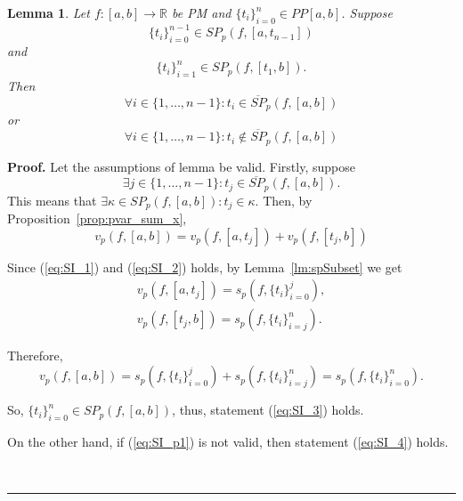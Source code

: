 \documentclass[12pt, a4paper]{article}
\newtheorem{lemma}[theorem]{Lemma}
\newenvironment{proof}[1][Proof]{\noindent \textbf{#1.} }{\  \rule{0.5em}{0.5em}}
\numberwithin{equation}{section}
\begin{document}
\begin{lemma}\label{lm:SI}
  Let $f:[a,b] \rightarrow \mathbb{R}$ be PM
  and $\{t_i\}_{i=0}^n \in PP[a, b]$.
  Suppose 
  \begin{equation}\label{eq:SI_1}
    \{t_i\}_{i=0}^{n-1} \in SP_p(f, [a, t_{n-1}]) 
  \end{equation} 
  and 
  \begin{equation}\label{eq:SI_2}
    \{t_i\}_{i=1}^{n} \in SP_p(f, [t_1, b]).
  \end{equation} 
  Then
  \begin{equation}\label{eq:SI_3}
    \forall i \in \{1,\dots,n-1\}: t_i \in \overline{SP}_p(f, [a, b])
  \end{equation} 
  or
  \begin{equation}\label{eq:SI_4}
    \forall i \in \{1,\dots,n-1\}: t_i \notin \overline{SP}_p(f, [a, b])
  \end{equation}   
\end{lemma}
\begin{proof}
  Let the assumptions of lemma be valid. 
  Firstly, suppose 
  \begin{equation}\label{eq:SI_p1}
    \exists j \in \{1,\dots,n-1\}: t_j \in \overline{SP}_p(f, [a, b]).
  \end{equation}
  This means that 
  $\exists \kappa \in SP_p(f, [a, b]): t_j \in \kappa$.
  Then, by Proposition~\ref{prop:pvar_sum_x},
  \begin{equation}
    v_p(f, [a, b]) = v_p(f, [a, t_j]) + v_p(f, [t_j, b])
  \end{equation}
  
  Since (\ref{eq:SI_1}) and (\ref{eq:SI_2}) holds, 
  by Lemma~\ref{lm:spSubset} we get 
  \begin{eqnarray}
    v_p(f, [a, t_j]) = s_p(f, \{t_i\}_{i=0}^j), \\
    v_p(f, [t_j, b]) = s_p(f, \{t_i\}_{i=j}^n).
  \end{eqnarray}
  
  Therefore,
  \begin{equation}
    v_p(f, [a, b]) = s_p(f, \{t_i\}_{i=0}^j) +  s_p(f, \{t_i\}_{i=j}^n)
      = s_p(f, \{t_i\}_{i=0}^n).
  \end{equation}  
  
  So, $\{t_i\}_{i=0}^n \in SP_p(f, [a, b])$, 
  thus, statement (\ref{eq:SI_3}) holds.
  
  On the other hand, if (\ref{eq:SI_p1}) is not valid, 
  then statement (\ref{eq:SI_4}) holds.  
  
\end{proof}
\end{document}
